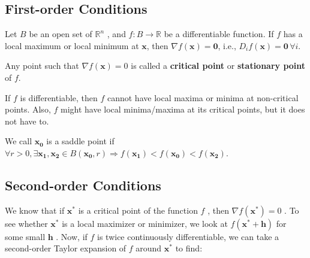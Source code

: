 \subsection{First-order Conditions}

\begin{proposition}
    Let \(B\) be an open set of \(\mathbb{R}^{n}\) , and \(f: B \to \mathbb{R}\) be a differentiable function. If \(f\) has a local maximum or local minimum at \(\mathbf{x}\), then \(\nabla f(\mathbf{x}) = \mathbf{0}\), i.e., \(D_{i}f(\mathbf{x}) = \mathbf{0} \, \forall i\).
\end{proposition}

\begin{definition}
    Any point such that \(\nabla f(\mathbf{x}) = 0\) is called a \textbf{critical point} or \textbf{stationary point} of \(f\).
\end{definition}

\begin{remark*}
    If \(f\) is differentiable, then \(f\) cannot have local maxima or minima at non-critical points. Also, \(f\) might have local minima/maxima at its critical points, but it does not have to.
\end{remark*}

\begin{definition} We call $\mathbf{x_0}$ is a saddle point if
    $\forall r > 0, \exists \mathbf{x_1, x_2} \in B(\mathbf{x_0}, r) \Longrightarrow f(\mathbf{x_1}) < f(\mathbf{x_0}) < f(\mathbf{x_2})$.
\end{definition}

\subsection{Second-order Conditions}

We know that if \(\mathbf{x}^{*}\) is a critical point of the function \(f\) , then \(\nabla f(\mathbf{x}^{*}) = 0\) . To see whether \(\mathbf{x}^{*}\) is a local maximizer or minimizer, we look at \(f(\mathbf{x}^{*} + \mathbf{h})\) for some small \(\mathbf{h}\) . Now, if \(f\) is twice continuously differentiable, we can take a second-order Taylor expansion of \(f\) around \(\mathbf{x}^{*}\) to find:

